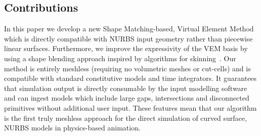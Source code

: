 \subsection*{Contributions} 
In this paper we develop a new Shape Matching-based, Virtual Element Method which is directly compatible 
with NURBS input geometry rather than piecewise linear surfaces. 
Furthermore, we improve the expressivity of the VEM basis by using a shape blending approach inspired by
algorithms for skinning~\cite{skinningcourse:2014}.
Our method is entirely meshless (requiring no volumetric meshes or cut-cells) and is compatible with standard constitutive models and time integrators.
It guarantees that simulation output is directly consumable by the input modelling software and can ingest models which include large gaps,
intersections and disconnected primitives without additional user input. 
These features mean that our algorithm is the first truly meshless approach for the direct simulation of curved surface, NURBS models in physics-based animation.

